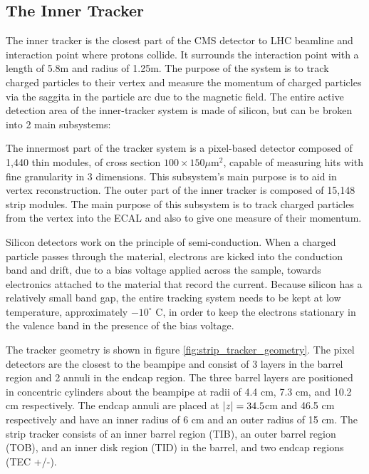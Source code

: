   \subsection{The Inner Tracker} \label{sec:inner_tracker}
    The inner tracker is the closest part of the CMS detector to LHC beamline and interaction point where protons collide. \cite{cms_jinst} It surrounds the interaction point with a length of 5.8m and radius of 1.25m. The purpose of the system is to track charged particles to their vertex and measure the momentum of charged particles via the saggita in the particle arc due to the magnetic field. The entire active detection area of the inner-tracker system is made of silicon, but can be broken into 2 main subsystems:

    \begin{enumerate}
       The innermost part of the tracker system is a pixel-based detector composed of 1,440 thin modules, of cross section $100 \times 150 \mu$m$^2$, capable of measuring hits with fine granularity in 3 dimensions. This subsystem's main purpose is to aid in vertex reconstruction.
       The outer part of the inner tracker is composed of 15,148 strip modules. The main purpose of this subsystem is to track charged particles from the vertex into the ECAL and also to give one measure of their momentum.
    \end{enumerate}

    Silicon detectors work on the principle of semi-conduction. When a charged particle passes through the material, electrons are kicked into the conduction band and drift, due to a bias voltage applied across the sample, towards electronics attached to the material that record the current. Because silicon has a relatively small band gap, the entire tracking system needs to be kept at low temperature, approximately $-10^\circ$ C, in order to keep the electrons stationary in the valence band in the presence of the bias voltage.

    The tracker geometry is shown in figure \ref{fig:strip_tracker_geometry}. The pixel detectors are the closest to the beampipe and consist of 3 layers in the barrel region and 2 annuli in the endcap region. The three barrel layers are positioned in concentric cylinders about the beampipe at radii of 4.4 cm, 7.3 cm, and 10.2 cm respectively. The endcap annuli are placed at $\lvert z \rvert = 34.5 $cm and 46.5 cm respectively and have an inner radius of 6 cm and an outer radius of 15 cm. The strip tracker consists of an inner barrel region (TIB), an outer barrel region (TOB), and an inner disk region (TID) in the barrel, and two endcap regions (TEC +/-). 

